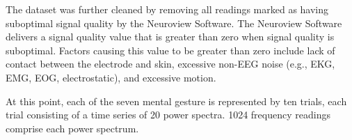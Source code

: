 The dataset was further cleaned by removing all readings marked as having suboptimal signal quality by the Neuroview Software. The Neuroview Software delivers a signal quality value that is greater than zero when signal quality is suboptimal. Factors causing this value to be greater than zero include lack of contact between the electrode and skin, excessive non-EEG noise (e.g., EKG, EMG, EOG, electrostatic), and excessive motion.

At this point, each of the seven mental gesture is represented by ten trials, each trial consisting of a time series of 20 power spectra. 1024 frequency readings comprise each power spectrum.